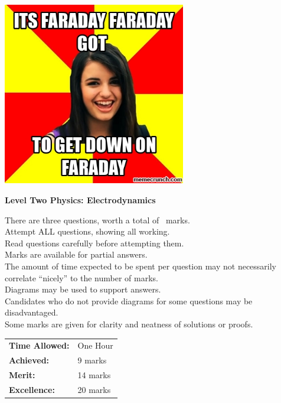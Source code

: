 \documentclass[a4paper,addpoints]{exam}
\begin{document}
\begin{coverpages}

\begin{center}
  \includegraphics[width=0.6\textwidth]{edyn_cover}

  \vspace{5mm}

  \textbf{\Huge{Level Two Physics: Electrodynamics}}
\end{center}

\vspace{5mm}

\noindent
\large{There are three questions, worth a total of \numpoints\ marks.\\
       Attempt ALL questions, showing all working.\\
       Read questions carefully before attempting them.\\
       Marks are available for partial answers.\\
       The amount of time expected to be spent per question may not necessarily correlate ``nicely'' to the number of marks.\\
       Diagrams may be used to support answers.\\
       Candidates who do not provide diagrams for some questions may be disadvantaged.\\
       Some marks are given for clarity and neatness of solutions or proofs.}
\vspace{2mm}

\vfill

\begin{flushright}
  \begin{tabular}{ll}
    \textbf{Time Allowed:}& One Hour\\
    \textbf{Achieved:}& 9 marks\\
    \textbf{Merit:}& 14 marks\\
    \textbf{Excellence:}& 20 marks
  \end{tabular}

  \gradetable[v][questions]
\end{flushright}

\end{coverpages}
\end{document}
